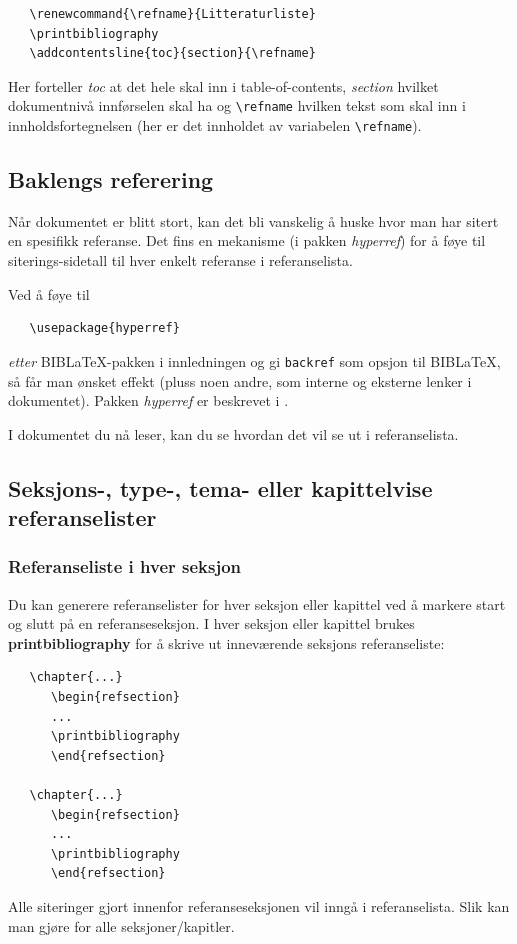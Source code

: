 \documentclass[11pt,norsk,a4paper]{article}
\newcommand{\kdo}[1]{\texttt{#1}}
\newcommand{\blt}{B{\smaller[2]IB}\discretionary{-}{}{\kern
    -0.12em}\LaTeX{}}
\begin{document}
{\footnotesize\begin{verbatim}
   \renewcommand{\refname}{Litteraturliste}
   \printbibliography
   \addcontentsline{toc}{section}{\refname}
\end{verbatim}}
\noindent{}Her forteller \textit{toc} at det hele skal inn i table-of-contents,
\textit{section} hvilket dokumentnivå innførselen skal ha og
\verb=\refname= hvilken tekst som skal inn i innholdsfortegnelsen
(her er det innholdet av variabelen \verb=\refname=).


\subsection{Baklengs referering} Når dokumentet er blitt stort, kan
det bli vanskelig å huske hvor man har sitert en spesifikk
referanse. Det fins en mekanisme (i pakken \textit{hyperref}) for å
føye til siterings-sidetall til hver enkelt referanse i
referanselista.

Ved å føye til

{\footnotesize\begin{verbatim}
   \usepackage{hyperref}
\end{verbatim}}
\noindent\textit{etter} \blt-pakken
i innledningen og gi \kdo{backref} som opsjon til \blt{}, så får man ønsket effekt (pluss noen andre, som
interne og eksterne lenker i dokumentet). Pakken \textit{hyperref} er
beskrevet i \cite{hyperref}.

I dokumentet du nå leser, kan du se hvordan det vil se ut i referanselista.

\subsection{Seksjons-, type-, tema- eller kapittelvise referanselister}
\subsubsection*{Referanseliste i hver seksjon}
Du kan generere referanselister for hver seksjon eller kapittel ved å
markere start og slutt på en referanseseksjon. I hver seksjon eller
kapittel brukes \textbf{printbibliography} for å skrive ut inneværende
seksjons referanseliste:

{\footnotesize\begin{verbatim}
   \chapter{...}
      \begin{refsection}
      ...
      \printbibliography
      \end{refsection}

   \chapter{...}
      \begin{refsection}
      ...
      \printbibliography
      \end{refsection}
\end{verbatim}}
\noindent{}Alle siteringer gjort innenfor referanseseksjonen vil inngå i
referanselista. Slik kan man gjøre for alle seksjoner/kapitler.
\end{document}

